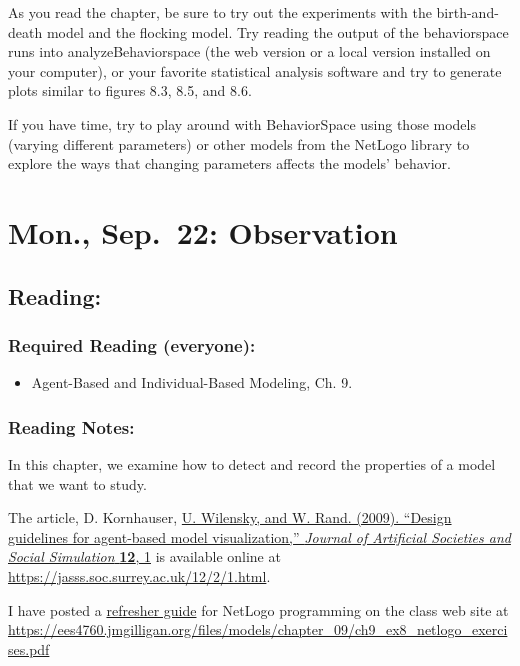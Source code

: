 \documentclass[
]{article}
\providecommand{\tightlist}{%
  \setlength{\itemsep}{0pt}\setlength{\parskip}{0pt}}
\begin{document}
As you read the chapter, be sure to try out the experiments with the
birth-and-death model and the flocking model. Try reading the output of
the behaviorspace runs into analyzeBehaviorspace (the web version or a
local version installed on your computer), or your favorite statistical
analysis software and try to generate plots similar to figures 8.3, 8.5,
and 8.6.

If you have time, try to play around with BehaviorSpace using those
models (varying different parameters) or other models from the NetLogo
library to explore the ways that changing parameters affects the models'
behavior.

\section{Mon., Sep.~22: Observation}\label{mon.-sep.-22-observation}

\subsection{Reading:}\label{reading-9}

\subsubsection{Required Reading
(everyone):}\label{required-reading-everyone-8}

\begin{itemize}
\tightlist
\item
  Agent-Based and Individual-Based Modeling, Ch. 9.
\end{itemize}

\subsubsection{Reading Notes:}\label{reading-notes-8}

In this chapter, we examine how to detect and record the properties of a
model that we want to study.

The article, D. Kornhauser,
\href{https://jasss.soc.surrey.ac.uk/12/2/1.html}{U. Wilensky, and W.
Rand. (2009). ``Design guidelines for agent-based model visualization,''
\emph{Journal of Artificial Societies and Social Simulation}
\textbf{12}, 1} is available online at
\url{https://jasss.soc.surrey.ac.uk/12/2/1.html}.

I have posted a
\href{/files/models/chapter_09/ch9_ex8_netlogo_exercises.pdf}{refresher
guide} for NetLogo programming on the class web site at
\url{https://ees4760.jmgilligan.org/files/models/chapter_09/ch9_ex8_netlogo_exercises.pdf}
\end{document}
